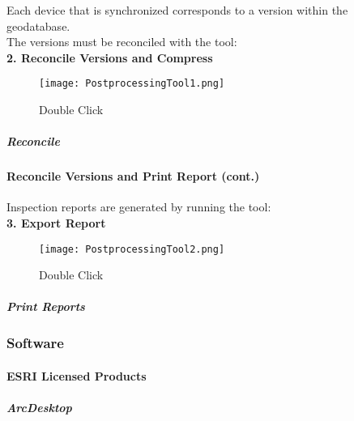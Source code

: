 Each device that is synchronized corresponds to a version within the geodatabase.\\

\noindent The versions must be reconciled with the tool:\\

\textbf{2. Reconcile Versions and Compress}

\vspace{1in}

\begin{wrapfigure}{r}{0.5\textwidth}

\centering
    \texttt{[image: PostprocessingTool1.png]}
\caption{Double Click}

\end{wrapfigure}
\subparagraph{Reconcile}
\vspace{1.5in}


\clearpage

\paragraph*{Reconcile Versions and Print Report {\footnotesize (cont.)}}

\vspace{.5in}

Inspection reports are generated by running the tool:\\

\textbf{3. Export Report}

\vspace{1in}

\begin{wrapfigure}{r}{0.6\textwidth}

\centering
    \texttt{[image: PostprocessingTool2.png]}
\caption{Double Click}
\end{wrapfigure}
\subparagraph{Print Reports}
\vspace{2in}


\clearpage
\subsubsection{Software}
\paragraph{ESRI Licensed Products}
\subparagraph{ArcDesktop}

